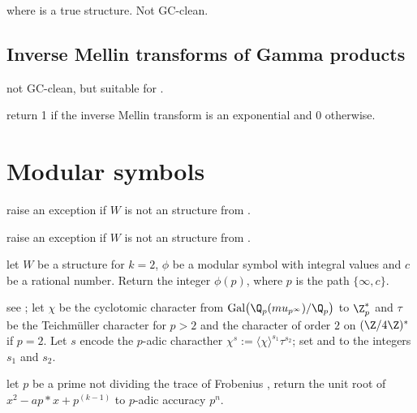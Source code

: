  where
 is a true  structure. Not GC-clean.


\section{Inverse Mellin transforms of Gamma products}



 not GC-clean, but
suitable for .

 return 1 if the inverse Mellin transform is
an exponential and 0 otherwise.



\newpage

\chapter{Modular symbols}

 raise an exception if $W$ is not an 
structure from .

 raise an exception if $W$ is not an
 structure from .

 let $W$ be a 
structure for $k = 2$, $\phi$ be a modular symbol with integral values
and $c$ be a rational number. Return the integer $\phi(p)$,
where $p$ is the path $\{\infty,c\}$.

 see ;
let $\chi$ be the  cyclotomic  character from
$\text{Gal}\big(\Q_p(mu_{p^\infty})/\Q_p\big)$ to $\Z_p^*$
and $\tau$ be the Teichm\"uller character for $p > 2$ and the character of
order $2$ on $(\Z/4\Z)^*$ if $p = 2$. Let $s$ encode
the $p$-adic characther $\chi^s := \langle\chi\rangle^{s_1} \tau^{s_2}$;
set  and  to the integers $s_1$ and $s_2$.

let $p$ be a prime not dividing the trace of Frobenius ,
return the unit root of $x^2 - ap*x + p^(k-1)$ to $p$-adic accuracy $p^n$.


